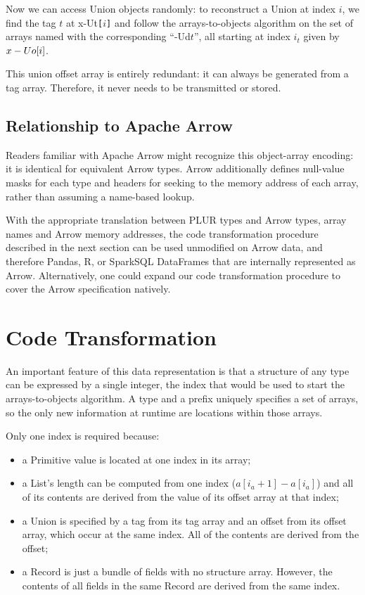 \documentclass[10pt, conference, compsocconf]{IEEEtran}
\begin{document}
Now we can access Union objects randomly: to reconstruct a Union at index $i$, we find the tag $t$ at x-Ut{\tt [}$i${\tt ]} and follow the arrays-to-objects algorithm on the set of arrays named with the corresponding ``-Ud$t$'', all starting at index $i_t$ given by $\mbox{x-Uo{\tt [}}i\mbox{\tt]}$.

This union offset array is entirely redundant: it can always be generated from a tag array. Therefore, it never needs to be transmitted or stored.

\subsection{Relationship to Apache Arrow}

Readers familiar with Apache Arrow might recognize this object-array encoding\cite{arrow-layout}: it is identical for equivalent Arrow types. Arrow additionally defines null-value masks for each type and headers for seeking to the memory address of each array, rather than assuming a name-based lookup.

With the appropriate translation between PLUR types and Arrow types, array names and Arrow memory addresses, the code transformation procedure described in the next section can be used unmodified on Arrow data, and therefore Pandas\cite{pandas}, R\cite{R}, or SparkSQL\cite{sparksql} DataFrames that are internally represented as Arrow. Alternatively, one could expand our code transformation procedure to cover the Arrow specification natively.

\section{Code Transformation}

An important feature of this data representation is that a structure of any type can be expressed by a single integer, the index that would be used to start the arrays-to-objects algorithm. A type and a prefix uniquely specifies a set of arrays, so the only new information at runtime are locations within those arrays.

Only one index is required because:
\begin{itemize}
\item a Primitive value is located at one index in its array;
\item a List's length can be computed from one index \mbox{($a[i_a + 1] - a[i_a]$)} and all of its contents are derived from the value of its offset array at that index;
\item a Union is specified by a tag from its tag array and an offset from its offset array, which occur at the same index. All of the contents are derived from the offset;
\item a Record is just a bundle of fields with no structure array. However, the contents of all fields in the same Record are derived from the same index.
\end{itemize}
\end{document}
